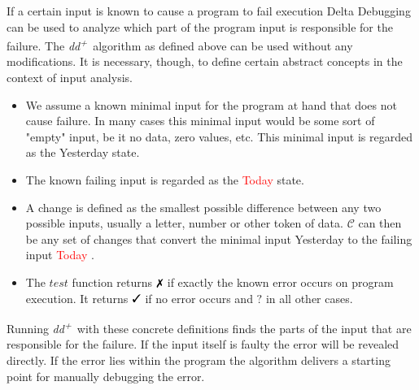 \documentclass[a4paper,UKenglish]{lipics-v2018}
\newcommand{\ddp}{\textit{dd\textsuperscript{+}}}
\newcommand{\green}[1]{\textcolor{td-green}{#1}}
\newcommand{\red}[1]{\textcolor{red}{#1}}
\newcommand{\yd}[0]{\green{Yesterday} }
\newcommand{\td}[0]{\red{Today} }
\newcommand{\C}[0]{\ensuremath{\mathcal{C}}}
\newcommand{\cmark}{\text{\ding{51}}}
\newcommand{\xmark}{\text{\ding{55}}}
\newcommand{\qmark}{\textbf{?}}
\begin{document}
If a certain input is known to cause a program to fail execution Delta Debugging can be used to analyze which part of the program input is responsible for the failure. The \ddp\ algorithm as defined above can be used without any modifications. It is necessary, though, to define certain abstract concepts in the context of input analysis.\\
\begin{itemize}
  	\item We assume a known minimal input for the program at hand that does not cause failure. In many cases this minimal input would be some sort of "empty" input, be it no data, zero values, etc. This minimal input is regarded as the \yd state.
  	\item The known failing input is regarded as the \td state.
  	\item A change is defined as the smallest possible difference between any two possible inputs, usually a letter, number or other token of data. $\C$ can then be any set of changes that convert the minimal input \yd to the failing input \td.
  	\item The $test$ function returns $\xmark$ if exactly the known error occurs on program execution. It returns $\cmark$ if no error occurs and $\qmark$ in all other cases. 
\end{itemize}

Running \ddp\ with these concrete definitions finds the parts of the input that are responsible for the failure. If the input itself is faulty the error will be revealed directly. If the error lies within the program the algorithm delivers a starting point for manually debugging the error.
\end{document}
